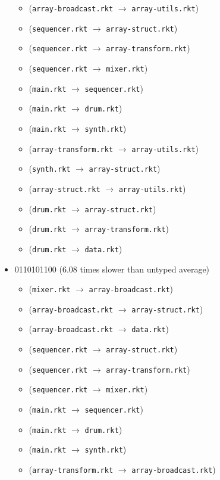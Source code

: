 \documentclass{article}
\newcommand{\mono}[1]{\texttt{#1}}
\begin{document}
\begin{itemize}
\begin{itemize}
  \item (\mono{array-broadcast.rkt} $\rightarrow$ \mono{array-utils.rkt})
  \item (\mono{sequencer.rkt} $\rightarrow$ \mono{array-struct.rkt})
  \item (\mono{sequencer.rkt} $\rightarrow$ \mono{array-transform.rkt})
  \item (\mono{sequencer.rkt} $\rightarrow$ \mono{mixer.rkt})
  \item (\mono{main.rkt} $\rightarrow$ \mono{sequencer.rkt})
  \item (\mono{main.rkt} $\rightarrow$ \mono{drum.rkt})
  \item (\mono{main.rkt} $\rightarrow$ \mono{synth.rkt})
  \item (\mono{array-transform.rkt} $\rightarrow$ \mono{array-utils.rkt})
  \item (\mono{synth.rkt} $\rightarrow$ \mono{array-struct.rkt})
  \item (\mono{array-struct.rkt} $\rightarrow$ \mono{array-utils.rkt})
  \item (\mono{drum.rkt} $\rightarrow$ \mono{array-struct.rkt})
  \item (\mono{drum.rkt} $\rightarrow$ \mono{array-transform.rkt})
  \item (\mono{drum.rkt} $\rightarrow$ \mono{data.rkt})
  \end{itemize}
\item 0110101100 (6.08 times slower than untyped average)
  \begin{itemize}
  \item (\mono{mixer.rkt} $\rightarrow$ \mono{array-broadcast.rkt})
  \item (\mono{array-broadcast.rkt} $\rightarrow$ \mono{array-struct.rkt})
  \item (\mono{array-broadcast.rkt} $\rightarrow$ \mono{data.rkt})
  \item (\mono{sequencer.rkt} $\rightarrow$ \mono{array-struct.rkt})
  \item (\mono{sequencer.rkt} $\rightarrow$ \mono{array-transform.rkt})
  \item (\mono{sequencer.rkt} $\rightarrow$ \mono{mixer.rkt})
  \item (\mono{main.rkt} $\rightarrow$ \mono{sequencer.rkt})
  \item (\mono{main.rkt} $\rightarrow$ \mono{drum.rkt})
  \item (\mono{main.rkt} $\rightarrow$ \mono{synth.rkt})
  \item (\mono{array-transform.rkt} $\rightarrow$ \mono{array-broadcast.rkt})

\end{itemize}
\end{itemize}
\end{document}

